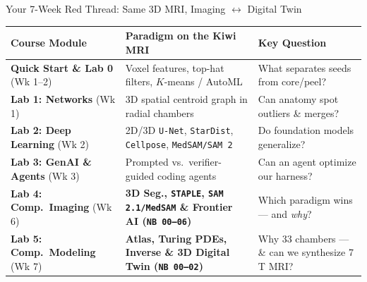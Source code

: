 \documentclass[aspectratio=169, 10pt]{beamer}
\begin{document}
\begin{frame}{Your 7-Week Red Thread: Same 3D MRI, Imaging $\leftrightarrow$ Digital Twin}
    \centering
    {\scriptsize
    \begin{tabular}{@{}p{}p{}p{}@{}}
        \toprule
        \textbf{Course Module} & \textbf{Paradigm on the Kiwi MRI} & \textbf{Key Question} \\
        \midrule
        \textbf{Quick Start \& Lab 0} (Wk 1--2) & Voxel features, top-hat filters, $K$-means / AutoML & What separates seeds from core/peel? \\
        \textbf{Lab 1: Networks} (Wk 1) & 3D spatial centroid graph in radial chambers & Can anatomy spot outliers \& merges? \\
        \textbf{Lab 2: Deep Learning} (Wk 2) & 2D/3D \texttt{U-Net}, \texttt{StarDist}, \texttt{Cellpose}, \texttt{MedSAM/SAM\,2} & Do foundation models generalize? \\
        \textbf{Lab 3: GenAI \& Agents} (Wk 3) & Prompted vs.\ verifier-guided coding agents & Can an agent optimize our harness? \\
        \textbf{Lab 4: Comp.\ Imaging} (Wk 6) & \textbf{3D Seg., \texttt{STAPLE}, \texttt{SAM\,2.1/MedSAM} \& Frontier AI (\texttt{NB 00--06})} & Which paradigm wins --- and \textit{why}? \\
        \textbf{Lab 5: Comp.\ Modeling} (Wk 7) & \textbf{Atlas, Turing PDEs, Inverse \& 3D Digital Twin (\texttt{NB 00--02})} & Why 33 chambers --- \& can we synthesize 7\,T MRI? \\
        \bottomrule
    \end{tabular}
    }


\end{frame}
\end{document}
